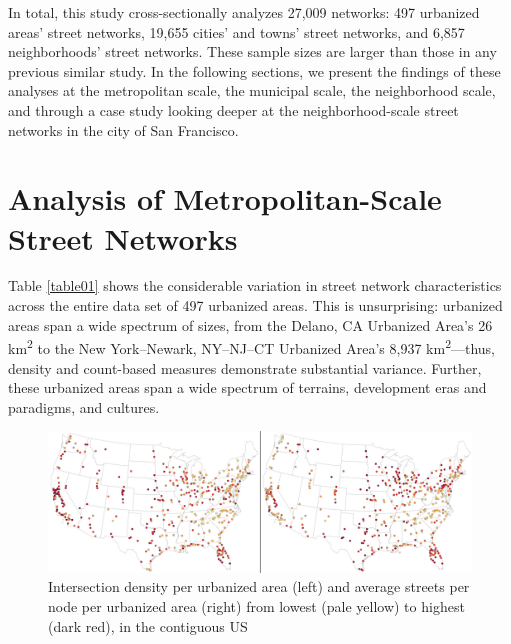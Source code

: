 \documentclass{article}
\begin{document}
In total, this study cross-sectionally analyzes 27,009 networks: 497 urbanized areas' street networks, 19,655 cities' and towns' street networks, and 6,857 neighborhoods' street networks. These sample sizes are larger than those in any previous similar study. In the following sections, we present the findings of these analyses at the metropolitan scale, the municipal scale, the neighborhood scale, and through a case study looking deeper at the neighborhood-scale street networks in the city of San Francisco.

\section{Analysis of Metropolitan-Scale Street Networks}

Table \ref{table01} shows the considerable variation in street network characteristics across the entire data set of 497 urbanized areas. This is unsurprising: urbanized areas span a wide spectrum of sizes, from the Delano, CA Urbanized Area's 26 km\textsuperscript{2} to the New York--Newark, NY--NJ--CT Urbanized Area's 8,937 km\textsuperscript{2}---thus, density and count-based measures demonstrate substantial variance. Further, these urbanized areas span a wide spectrum of terrains, development eras and paradigms, and cultures.

\begin{figure}
\includegraphics[width=1\textwidth]{media/fig01.png}
\caption{Intersection density per urbanized area (left) and average streets per node per urbanized area (right) from lowest (pale yellow) to highest (dark red), in the contiguous US}
\label{fig01}
\end{figure}
\end{document}
